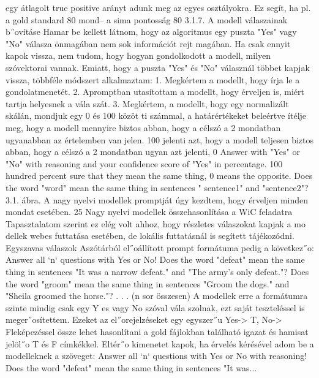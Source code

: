 \documentclass[12pt]{report}
\theoremstyle{definition}
\begin{document}
 egy átlagolt true positive arányt adunk meg az egyes osztályokra.
 Ez segít, ha pl. a gold standard 80%
 mond– a sima pontosság 80%
 3.1.7. A modell válaszainak b˝ovításe
 Hamar be kellett látnom, hogy az algoritmus egy puszta "Yes" vagy "No" válasza
 önmagában nem sok információt rejt magában. Ha csak ennyit kapok vissza, nem tudom,
 hogy hogyan gondolkodott a modell, milyen szóvektorai vannak. Emiatt, hogy a puszta
 "Yes" és "No" válasznál többet kapjak vissza, többféle módszert alkalmaztam:
 1. Megkértem a modellt, hogy írja le a gondolatmenetét.
 2. Apromptban utasítottam a modellt, hogy érveljen is, miért tartja helyesnek a vála
szát.
 3. Megkértem, a modellt, hogy egy normalizált skálán, mondjuk egy 0 és 100 közöt
ti számmal, a határértékeket beleértve ítélje meg, hogy a modell mennyire biztos
 abban, hogy a célszó a 2 mondatban ugyanabban az értelemben van jelen. 100%
 jelenti azt, hogy a modell teljesen biztos abban, hogy a célszó a 2 mondatban ugyan
azt jelenti, 0%
 Answer with "Yes" or "No" with reasoning and your confidence
 score of "Yes" in percentage. 100%
 hundred percent sure that they mean the same thing, 0%
 means the opposite.
 Does the word "{word}" mean the same thing in sentences "{
 sentence1}" and "{sentence2}"?
 3.1. ábra. A nagy nyelvi modellek promptját úgy kezdtem, hogy érveljen minden mondat
 esetében.
 25
Nagy nyelvi modellek összehasonlítása a WiC feladatra
 Tapasztalatom szerint ez elég volt ahhoz, hogy részletes válaszokat kapjak a mo
dellek webes futtatása esetében, de lokális futtatásnál is segített tájékozódni.
 Egyszavas válaszok
 Aszótárból el˝oállított prompt formátuma pedig a következ˝o:
 Answer all ‘n‘ questions with Yes or No!
 Does the word "defeat" mean the same thing in sentences
 "It was a narrow defeat." and "The army’s only defeat."?
 Does the word "groom" mean the same thing in sentences
 "Groom the dogs." and "Sheila groomed the horse."?
 .
 .
 .
 (n sor összesen)
 A modellek erre a formátumra szinte mindig csak egy Y es vagy No szóval vála
szolnak, ezt saját teszteléssel is meger˝osítettem. Ezeket az el˝orejelzéseket egy egyszer˝u
 Yes-> T, No-> Fleképezéssel össze lehet hasonlítani a gold fájlokban található
 igazat és hamisat jelöl˝o T és F címkékkel.
 Eltér˝o kimenetet kapok, ha érvelés kérésével adom be a modelleknek a szöveget:
 Answer all ‘n‘ questions with Yes or No with reasoning!
 Does the word "defeat" mean the same thing in sentences
 "It was...
\end{document}
